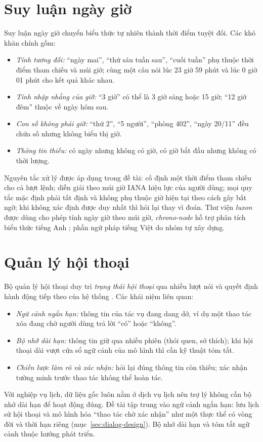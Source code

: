 \section{Suy luận ngày giờ}
Suy luận ngày giờ chuyển biểu thức tự nhiên thành thời điểm tuyệt đối. Các khó khăn chính gồm:
\begin{itemize}
  \item \textit{Tính tương đối:} “ngày mai”, “thứ sáu tuần sau”, “cuối tuần” phụ thuộc thời điểm tham chiếu và múi giờ; cùng một câu nói lúc 23 giờ 59 phút và lúc 0 giờ 01 phút cho kết quả khác nhau.
  \item \textit{Tính nhập nhằng của giờ:} “3 giờ” có thể là 3 giờ sáng hoặc 15 giờ; “12 giờ đêm” thuộc về ngày hôm sau.
  \item \textit{Con số không phải giờ:} “thứ 2”, “5 người”, “phòng 402”, “ngày 20/11” đều chứa số nhưng không biểu thị giờ.
  \item \textit{Thông tin thiếu:} có ngày nhưng không có giờ, có giờ bắt đầu nhưng không có thời lượng.
\end{itemize}
Nguyên tắc xử lý được áp dụng trong đề tài: cố định một thời điểm tham chiếu cho cả lượt lệnh; diễn giải theo múi giờ IANA hiệu lực của người dùng; mọi quy tắc mặc định phải tất định và không phụ thuộc giờ hiện tại theo cách gây bất ngờ; khi không xác định được duy nhất thì hỏi lại thay vì đoán. Thư viện \textit{luxon} được dùng cho phép tính ngày giờ theo múi giờ, \textit{chrono-node} hỗ trợ phân tích biểu thức tiếng Anh \cite{luxon,chrono}; phần ngữ pháp tiếng Việt do nhóm tự xây dựng.

\section{Quản lý hội thoại}
Bộ quản lý hội thoại duy trì \textit{trạng thái hội thoại} qua nhiều lượt nói và quyết định hành động tiếp theo của hệ thống \cite{jurafsky}. Các khái niệm liên quan:
\begin{itemize}
  \item \textit{Ngữ cảnh ngắn hạn:} thông tin của tác vụ đang dang dở, ví dụ một thao tác xóa đang chờ người dùng trả lời “có” hoặc “không”.
  \item \textit{Bộ nhớ dài hạn:} thông tin giữ qua nhiều phiên (thói quen, sở thích); khi hội thoại dài vượt cửa sổ ngữ cảnh của mô hình thì cần kỹ thuật tóm tắt.
  \item \textit{Chiến lược làm rõ và xác nhận:} hỏi lại đúng thông tin còn thiếu; xác nhận tường minh trước thao tác không thể hoàn tác.
\end{itemize}
Với nghiệp vụ lịch, dữ liệu gốc luôn nằm ở dịch vụ lịch nên trợ lý không cần bộ nhớ dài hạn để hoạt động đúng. Đề tài tập trung vào ngữ cảnh ngắn hạn: lưu lịch sử hội thoại và mô hình hóa “thao tác chờ xác nhận” như một thực thể có vòng đời và thời hạn riêng (mục~\ref{sec:dialog-design}). Bộ nhớ dài hạn và tóm tắt ngữ cảnh thuộc hướng phát triển.

